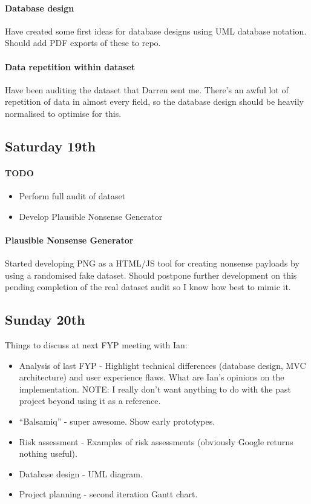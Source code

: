\paragraph{Database design} Have created some first ideas for database designs
using UML database notation. Should add PDF exports of these to repo.

\paragraph{Data repetition within dataset} Have been auditing the dataset that
Darren sent me. There's an awful lot of repetition of data in almost every
field, so the database design should be heavily normalised to optimise for this.

\subsection{Saturday 19th}

\paragraph{TODO}
\begin{itemize}
\item Perform full audit of dataset
\item Develop Plausible Nonsense Generator
\end{itemize}

\paragraph{Plausible Nonsense Generator} Started developing PNG as a HTML/JS
tool for creating nonsense payloads by using a randomised fake dataset. Should
postpone further development on this pending completion of the real dataset
audit so I know how best to mimic it.

\subsection{Sunday 20th}

\noindent
Things to discuss at next FYP meeting with Ian:
\begin{itemize}
\item Analysis of last FYP - Highlight technical differences (database design,
  MVC architecture) and user experience flaws. What are Ian's opinions on the
  implementation. NOTE: I really don't want anything to do with the past
  project beyond using it as a reference.
\item ``Balsamiq'' - super awesome. Show early prototypes.
\item Risk assessment - Examples of risk assessments (obviously Google returns
  nothing useful).
\item Database design - UML diagram.
\item Project planning - second iteration Gantt chart.
\end{itemize}

